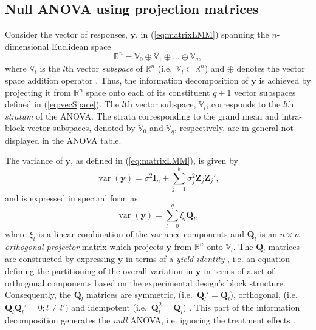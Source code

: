 \documentclass[article]{jss}
\newcommand{\I}{\mathbf{I}}
\newcommand{\Z}{\mathbf{Z}}
\newcommand{\Q}{\mathbf{Q}}
\begin{document}
\subsection{Null ANOVA using projection matrices}
\label{subsec:strataDecompProj}
Consider the vector of responses, $\bm{y}$, in (\ref{eq:matrixLMM}) spanning the $n$-dimensional Euclidean space
\begin{equation}
\label{eq:vecSpace}
\mathbb{R}^n = \mathbb{V}_0 \oplus \mathbb{V}_1 \oplus \dots \oplus \mathbb{V}_{q},
\end{equation} 
where $\mathbb{V}_l$ is the $l$th vector \emph{subspace} of $\mathbb{R}^n$ (i.e.\ $\mathbb{V}_l \subset \mathbb{R}^n$) and  $\oplus$ denotes the vector space addition operator \citep{Hadi1996}. Thus, the information decomposition of $\bm{y}$ is achieved by projecting it from $\mathbb{R}^n$ space onto each of its constituent $q + 1$ vector subspaces defined in (\ref{eq:vecSpace}). The $l$th vector subspace, $\mathbb{V}_l$, corresponds to the $l$th \emph{stratum} of the ANOVA. The strata corresponding to the grand mean and intra-block vector subspaces, denoted by $\mathbb{V}_0$ and $\mathbb{V}_{q}$, respectively, are in general not displayed in the ANOVA table. 

The variance of $\bm{y}$, as defined in (\ref{eq:matrixLMM}), is given by
\begin{equation}
\label{eq:varMat}
\operatorname{var}(\bm{y}) = \sigma^2\I_n + \sum_{j=1}^{b} \sigma_j^2 \Z_j\Z_j',
\end{equation}
and is expressed in spectral form as 
\begin{equation}
\label{eq:strata}
\operatorname{var}(\bm{y}) = \sum_{l=0}^{q} \xi_l \Q_l,
\end{equation}
where $\xi_l$ is a linear combination of the variance components and $\Q_l$ is an $n \times n$ \emph{orthogonal projector} matrix which projects $\bm{y}$ from $\mathbb{R}^n$ onto $\mathbb{V}_l$. The $\Q_l$ matrices are constructed by expressing $\bm{y}$ in terms of a \emph{yield identity} \citep{Nelder1965A}, i.e. an equation defining the partitioning of the overall variation in $\bm{y}$ in terms of a set of orthogonal components based on the experimental design's block structure. Consequently, the $\Q_l$ matrices are symmetric, (i.e.\ $\Q_l' = \Q_l$), orthogonal, (i.e.\ $\Q_l\Q_{l}' = 0; l \neq l'$) and idempotent (i.e.\ $\Q_l^2 = \Q_l$) \citep{Hadi1996}. This part of the information decomposition generates the \emph{null} ANOVA, i.e. ignoring the treatment effects \citep{Nelder1965A}.
\end{document}
